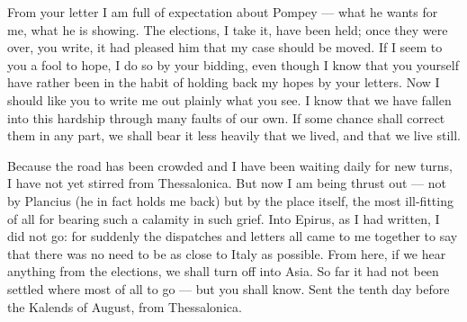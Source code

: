 

 From your letter I am full of expectation about Pompey --- what he wants for me, what he is showing. The elections, I take it, have been held; once they were over, you write, it had pleased him that my case should be moved. If I seem to you a fool to hope, I do so by your bidding, even though I know that you yourself have rather been in the habit of holding back my hopes by your letters. Now I should like you to write me out plainly what you see. I know that we have fallen into this hardship through many faults of our own. If some chance shall correct them in any part, we shall bear it less heavily that we lived, and that we live still.

 Because the road has been crowded and I have been waiting daily for new turns, I have not yet stirred from Thessalonica. But now I am being thrust out --- not by Plancius (he in fact holds me back) but by the place itself, the most ill-fitting of all for bearing such a calamity in such grief. Into Epirus, as I had written, I did not go: for suddenly the dispatches and letters all came to me together to say that there was no need to be as close to Italy as possible. From here, if we hear anything from the elections, we shall turn off into Asia. So far it had not been settled where most of all to go --- but you shall know. Sent the tenth day before the Kalends of August, from Thessalonica.
